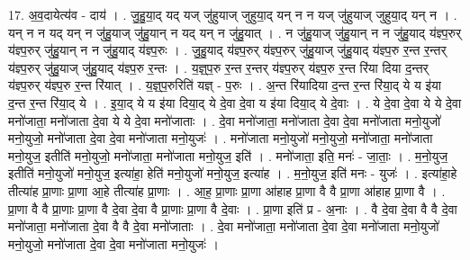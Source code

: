 \documentclass[17pt]{extarticle}
\begin{document}
17. अ॒व॒दायेत्य॑व - दाय॑ । . जु॒हु॒या॒द् यद् यज् जु॑हुयाज् जुहुया॒द् यन् न न यज् जु॑हुयाज् जुहुया॒द् यन् न । . यन् न न यद् यन् न जु॑हु॒याज् जु॑हु॒यान् न यद् यन् न जु॑हु॒यात् । . न जु॑हु॒याज् जु॑हु॒यान् न न जु॑हु॒याद् य॑ज्ञ्प॒रुर् य॑ज्ञ्प॒रुर् जु॑हु॒यान् न न जु॑हु॒याद् य॑ज्ञ्प॒रुः । . जु॒हु॒याद् य॑ज्ञ्प॒रुर् य॑ज्ञ्प॒रुर् जु॑हु॒याज् जु॑हु॒याद् य॑ज्ञ्प॒रु र॒न्त र॒न्तर् य॑ज्ञ्प॒रुर् जु॑हु॒याज् जु॑हु॒याद् य॑ज्ञ्प॒रु र॒न्तः । . य॒ज्ञ्॒प॒रु र॒न्त र॒न्तर् य॑ज्ञ्प॒रुर् य॑ज्ञ्प॒रु र॒न्त रि॑या दिया द॒न्तर् य॑ज्ञ्प॒रुर् य॑ज्ञ्प॒रु र॒न्त रि॑यात् । . य॒ज्ञ्॒प॒रुरिति॑ यज्ञ् - प॒रुः । . अ॒न्त रि॑यादिया द॒न्त र॒न्त रि॑या॒द् ये य इ॑या द॒न्त र॒न्त रि॑या॒द् ये । . इ॒या॒द् ये य इ॑या दिया॒द् ये दे॒वा दे॒वा य इ॑या दिया॒द् ये दे॒वाः । . ये दे॒वा दे॒वा ये ये दे॒वा मनो॑जाता॒ मनो॑जाता दे॒वा ये ये दे॒वा मनो॑जाताः । . दे॒वा मनो॑जाता॒ मनो॑जाता दे॒वा दे॒वा मनो॑जाता मनो॒युजो॑ मनो॒युजो॒ मनो॑जाता दे॒वा दे॒वा मनो॑जाता मनो॒युजः॑ । . मनो॑जाता मनो॒युजो॑ मनो॒युजो॒ मनो॑जाता॒ मनो॑जाता मनो॒युज॒ इतीति॑ मनो॒युजो॒ मनो॑जाता॒ मनो॑जाता मनो॒युज॒ इति॑ । . मनो॑जाता॒ इति॒ मनः॑ - जा॒ताः॒ । . म॒नो॒युज॒ इतीति॑ मनो॒युजो॑ मनो॒युज॒ इत्या॑हा॒ हेति॑ मनो॒युजो॑ मनो॒युज॒ इत्या॑ह । . म॒नो॒युज॒ इति॑ मनः - युजः॑ । . इत्या॑हा॒हे तीत्या॑ह प्रा॒णाः प्रा॒णा आ॒हे तीत्या॑ह प्रा॒णाः । . आ॒ह॒ प्रा॒णाः प्रा॒णा आ॑हाह प्रा॒णा वै वै प्रा॒णा आ॑हाह प्रा॒णा वै । . प्रा॒णा वै वै प्रा॒णाः प्रा॒णा वै दे॒वा दे॒वा वै प्रा॒णाः प्रा॒णा वै दे॒वाः । . प्रा॒णा इति॑ प्र - अ॒नाः । . वै दे॒वा दे॒वा वै वै दे॒वा मनो॑जाता॒ मनो॑जाता दे॒वा वै वै दे॒वा मनो॑जाताः । . दे॒वा मनो॑जाता॒ मनो॑जाता दे॒वा दे॒वा मनो॑जाता मनो॒युजो॑ मनो॒युजो॒ मनो॑जाता दे॒वा दे॒वा मनो॑जाता मनो॒युजः॑ । \newline
\end{document}
